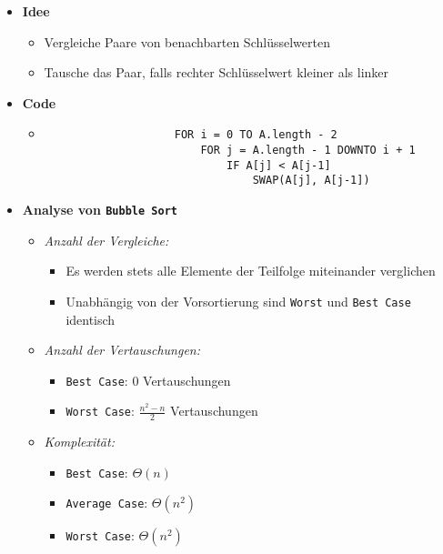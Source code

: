     \begin{itemize}
        \item \textbf{Idee}
            \begin{itemize}
                \item Vergleiche Paare von benachbarten Schlüsselwerten
                \item Tausche das Paar, falls rechter Schlüsselwert kleiner als linker
            \end{itemize}
        
        \item \textbf{Code}
            \begin{itemize}
                \item[]
                    \begin{verbatim}  
                    FOR i = 0 TO A.length - 2
                        FOR j = A.length - 1 DOWNTO i + 1
                            IF A[j] < A[j-1]
                                SWAP(A[j], A[j-1])
                    \end{verbatim}
            \end{itemize}

        \item \textbf{Analyse von \texttt{Bubble Sort}}
            \begin{itemize}
                \item \textit{Anzahl der Vergleiche:}
                    \begin{itemize}
                        \item Es werden stets alle Elemente der Teilfolge miteinander verglichen
                        \item Unabhängig von der Vorsortierung sind \texttt{Worst} und \texttt{Best Case} identisch
                    \end{itemize}
                
                \item \textit{Anzahl der Vertauschungen:}
                    \begin{itemize}
                        \item \texttt{Best Case}: 0 Vertauschungen
                        \item \texttt{Worst Case}: $\frac{n^2-n}{2}$ Vertauschungen
                    \end{itemize}
                
                \item \textit{Komplexität:}
                    \begin{itemize}
                        \item \texttt{Best Case}: $\Theta(n)$
                        \item \texttt{Average Case}: $\Theta(n^2)$
                        \item \texttt{Worst Case}: $\Theta(n^2)$
                    \end{itemize}
            \end{itemize}
        
    \end{itemize}



